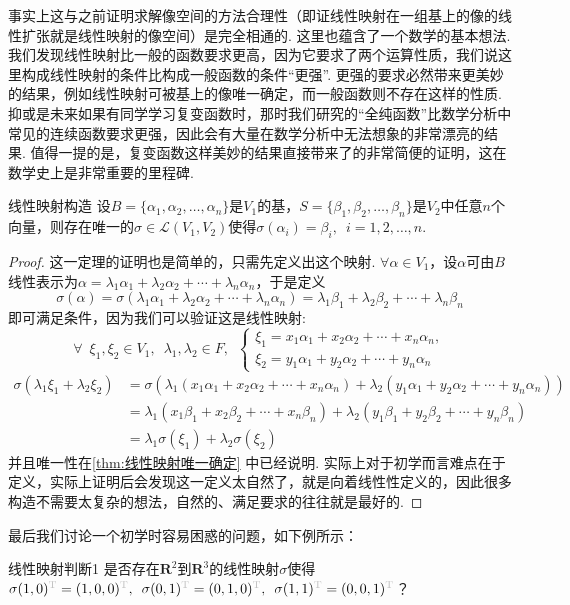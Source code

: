 事实上这与之前证明求解像空间的方法合理性（即证线性映射在一组基上的像的线性扩张就是线性映射的像空间）是完全相通的. 这里也蕴含了一个数学的基本想法. 我们发现线性映射比一般的函数要求更高，因为它要求了两个运算性质，我们说这里构成线性映射的条件比构成一般函数的条件``更强''. 更强的要求必然带来更美妙的结果，例如线性映射可被基上的像唯一确定，而一般函数则不存在这样的性质. 抑或是未来如果有同学学习复变函数时，那时我们研究的``全纯函数''比数学分析中常见的连续函数要求更强，因此会有大量在数学分析中无法想象的非常漂亮的结果. 值得一提的是，复变函数这样美妙的结果直接带来了的非常简便的证明，这在数学史上是非常重要的里程碑.

\begin{theorem}{}{线性映射构造}
    设$B=\{\alpha_1,\alpha_2,\ldots,\alpha_n\}$是$V_1$的基，$S=\{\beta_1,\beta_2,\ldots,\beta_n\}$是$V_2$中任意$n$个向量，则存在唯一的$\sigma\in \mathcal{L}(V_1,V_2)$使得$\sigma(\alpha_i)=\beta_i,\enspace i=1,2,\ldots,n$.
\end{theorem}

\begin{proof}
    这一定理的证明也是简单的，只需先定义出这个映射. $\forall \alpha \in V_1$，设$\alpha$可由$B$线性表示为$\alpha=\lambda_1\alpha_1+\lambda_2\alpha_2+\cdots+\lambda_n\alpha_n$，于是定义
    \[\sigma(\alpha)=\sigma(\lambda_1\alpha_1+\lambda_2\alpha_2+\cdots+\lambda_n\alpha_n)=\lambda_1\beta_1+\lambda_2\beta_2+\cdots+\lambda_n\beta_n\]
    即可满足条件，因为我们可以验证这是线性映射:
    \[
    \forall \enspace \xi_1, \xi_2 \in V_1, \enspace \lambda_1, \lambda_2 \in F, \enspace \begin{cases}
        \xi_1 = x_1\alpha_1+x_2\alpha_2+\cdots+x_n\alpha_n,\\
        \xi_2 = y_1\alpha_1+y_2\alpha_2+\cdots+y_n\alpha_n
    \end{cases}
    \]
    \begin{align*}
        \sigma(\lambda_1 \xi_1 + \lambda_2 \xi_2) &= \sigma(\lambda_1(x_1\alpha_1+x_2\alpha_2+\cdots+x_n\alpha_n) + \lambda_2(y_1\alpha_1+y_2\alpha_2+\cdots+y_n\alpha_n))\\
        &= \lambda_1(x_1\beta_1+x_2\beta_2+\cdots+x_n\beta_n) + \lambda_2(y_1\beta_1+y_2\beta_2+\cdots+y_n\beta_n)\\
        &= \lambda_1\sigma(\xi_1) + \lambda_2\sigma(\xi_2)
    \end{align*}
    并且唯一性在\autoref{thm:线性映射唯一确定} 中已经说明. 实际上对于初学而言难点在于定义，实际上证明后会发现这一定义太自然了，就是向着线性性定义的，因此很多构造不需要太复杂的想法，自然的、满足要求的往往就是最好的.
\end{proof}
最后我们讨论一个初学时容易困惑的问题，如下例所示：
\begin{example}{}{线性映射判断1}
    是否存在$\mathbf{R}^2$到$\mathbf{R}^3$的线性映射$\sigma$使得$\sigma(1,0)^{\color{lightgray}\mathrm{T}}=(1,0,0)^{\color{lightgray}\mathrm{T}},\enspace\sigma(0,1)^{\color{lightgray}\mathrm{T}}=(0,1,0)^{\color{lightgray}\mathrm{T}},\enspace\sigma(1,1)^{\color{lightgray}\mathrm{T}}=(0,0,1)^{\color{lightgray}\mathrm{T}}$？
\end{example}

